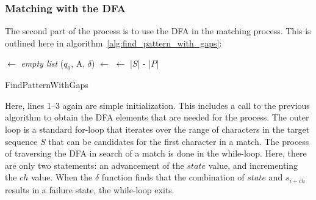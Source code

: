 \subsubsection{Matching with the DFA}

The second part of the process is to use the DFA in the matching process. This is outlined here in algorithm~\ref{alg:find_pattern_with_gaps}:

\IncMargin{1em}
\begin{algorithm}[ht]
  \DontPrintSemicolon

  \BlankLine
  \Matches $\leftarrow$ \textit{empty list}\;
  ($q_0$, A, $\delta$) $\leftarrow$ \;
  \End $\leftarrow$ |$S$| - |$P$|\;
  \KwRet{\Matches}\;
\caption{FindPatternWithGaps}
\label{alg:find_pattern_with_gaps}
\end{algorithm}
\DecMargin{1em}

Here, lines 1--3 again are simple initialization. This includes a call to the previous algorithm to obtain the DFA elements that are needed for the process. The outer loop is a standard for-loop that iterates over the range of characters in the target sequence $S$ that can be candidates for the first character in a match. The process of traversing the DFA in search of a match is done in the while-loop. Here, there are only two statements: an advancement of the $state$ value, and incrementing the $ch$ value. When the $\delta$ function finds that the combination of $state$ and $s_{i+ch}$ results in a failure state, the while-loop exits.

